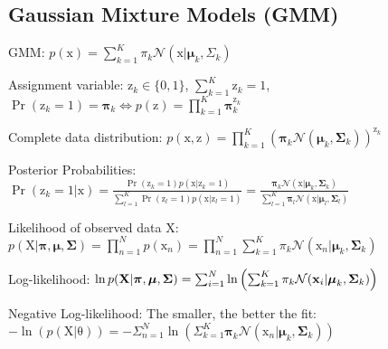 \documentclass[a4paper, 11pt, landscape]{article}
\newcommand{\matr}[1]{\boldsymbol{\mathrm{#1}}}
\begin{document}
\begin{multicols*}{3}
\section{Gaussian Mixture Models (GMM)}
\begin{compactdesc}
	\item[GMM:] $p(\matr{x}) = \sum_{k=1}^K \pi_k \mathcal{N}(\matr{x} | \boldsymbol{\mu}_k, \Sigma_k)$
	\item[Assignment variable:] $\matr{z}_k \in \{0, 1\}$, $\sum_{k=1}^K \matr{z}_k = 1$, $\operatorname{Pr}(\matr{z}_k = 1) = \boldsymbol{\pi}_k \Leftrightarrow p(\matr{z}) = \prod_{k=1}^K \boldsymbol{\pi}_k^{\matr{z}_k}$
	\item[Complete data distribution:] $p(\matr{x}, \matr{z}) = \prod_{k=1}^K \left( \boldsymbol{\pi}_k \mathcal{N}(\boldsymbol{\mu}_k, \boldsymbol{\Sigma}_k) \right)^{\matr{z}_k}$
	\item[Posterior Probabilities:] $\operatorname{Pr}(\matr{z}_k = 1 | \matr{x}) = \frac{\operatorname{Pr}(\matr{z}_k = 1) p(\matr{x} | \matr{z}_k = 1)}{\sum_{l=1}^K \operatorname{Pr}(\matr{z}_l = 1) p(\matr{x} | \matr{z}_l = 1)} = \frac{\boldsymbol{\pi}_k \mathcal{N}(\matr{x} | \boldsymbol{\mu}_k, \boldsymbol{\Sigma}_k)}{\sum_{l=1}^K \boldsymbol{\pi}_l \mathcal{N}(\matr{x} | \boldsymbol{\mu}_l, \boldsymbol{\Sigma}_l)}$
	\item[Likelihood of observed data $\matr{X}$:] $p(\matr{X} | \boldsymbol{\pi}, \boldsymbol{\mu}, \boldsymbol{\Sigma}) = \prod_{n=1}^N p(\matr{x}_n) = \prod_{n=1}^N \sum_{k=1}^K \pi_k \mathcal{N}(\matr{x}_n | \boldsymbol{\mu}_k, \boldsymbol{\Sigma}_k)$
	\item[Log-likelihood:] $\ln p(\matr{X} | \boldsymbol{\pi}, \boldsymbol{\mu}, \boldsymbol{\Sigma}) =\break \sum_{i=1}^N \ln \left( \sum_{k=1}^K \pi_k \mathcal{N}(\matr{x}_i | \boldsymbol{\mu}_k, \boldsymbol{\Sigma}_k) \right)$
	\item[Negative Log-likelihood:] The smaller, the better the fit: $-\ln(p(\matr{X} | \matr{\theta})) = -\Sigma_{n=1}^N \ln\left( \Sigma_{k=1}^K \boldsymbol{\pi}_k \mathcal{N}(\matr{x}_n | \boldsymbol{\mu}_k, \boldsymbol{\Sigma}_k) \right)$
\end{compactdesc}


\end{multicols*}
\end{document}
